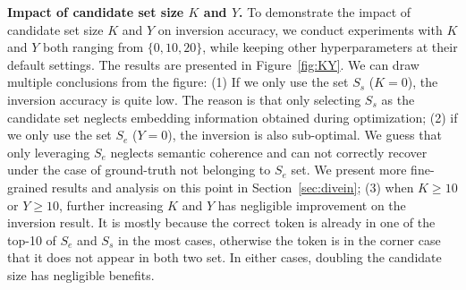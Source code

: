 \noindent\textbf{Impact of candidate set size $K$ and $Y$.} To demonstrate the impact of candidate set size $K$ and $Y$ on inversion accuracy, we conduct experiments with $K$ and $Y$ both ranging from $\{0,10,20\}$, while keeping other hyperparameters at their default settings. The results are presented in Figure~\ref{fig:KY}. We can draw multiple conclusions from the figure: (1) If we only use the set $S_s$ ($K=0$), the inversion accuracy is quite low. The reason is that only selecting $S_s$ as the candidate set neglects embedding information obtained during optimization; (2) if we only use the set $S_e$ ($Y=0$), the inversion is also sub-optimal. We guess that only leveraging $S_e$ neglects semantic coherence and can not correctly recover under the case of ground-truth not belonging to $S_e$ set.  We present more fine-grained results and analysis on this point in Section~\ref{sec:divein}; 
(3) when $K\ge 10$ or $Y\ge 10$, further increasing $K$ and $Y$ has negligible improvement on the inversion result. It is mostly because the correct token is already in one of the top-10 of $S_e$ and $S_s$ in the most cases, otherwise the token is in the corner case that it does not appear in both two set. In either cases, doubling the candidate size has negligible benefits.





